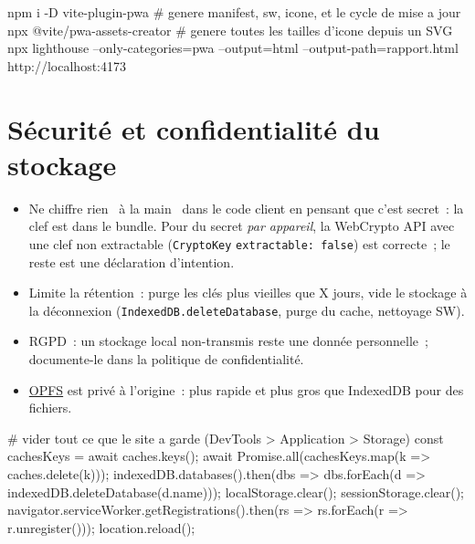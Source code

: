 \documentclass[12pt,a4paper,twoside,openright]{book}
\newcommand{\link}[2]{\href{#2}{#1}}
\begin{document}
\begin{terminal}
npm i -D vite-plugin-pwa       # genere manifest, sw, icone, et le cycle de mise a jour
npx @vite/pwa-assets-creator   # genere toutes les tailles d'icone depuis un SVG
npx lighthouse --only-categories=pwa --output=html --output-path=rapport.html http://localhost:4173
\end{terminal}

\section{S\'ecurit\'e et confidentialit\'e du stockage}

\begin{itemize}
  \item Ne chiffre rien \og ~\`a la main~ \fg{} dans le code client en pensant que c'est secret~:
        la clef est dans le bundle. Pour du secret \emph{par appareil}, la WebCrypto API avec une
        clef non extractable (\verb|CryptoKey| \verb|extractable: false|) est correcte~; le reste
        est une d\'eclaration d'intention.
  \item Limite la r\'etention~: purge les cl\'es plus vieilles que X jours, vide le stockage \`a la
        d\'econnexion (\verb|IndexedDB.deleteDatabase|, purge du cache, nettoyage SW).
  \item RGPD~: un stockage local non-transmis reste une donn\'ee personnelle~; documente-le dans la
        politique de confidentialit\'e.
  \item \link{OPFS}{https://developer.mozilla.org/en-US/docs/Web/API/File\_System\_API/Origin\_private\_file\_system}
        est priv\'e \`a l'origine~: plus rapide et plus gros que IndexedDB pour des fichiers.
\end{itemize}

\begin{terminal}
# vider tout ce que le site a garde (DevTools > Application > Storage)
const cachesKeys = await caches.keys(); await Promise.all(cachesKeys.map(k => caches.delete(k)));
indexedDB.databases().then(dbs => dbs.forEach(d => indexedDB.deleteDatabase(d.name)));
localStorage.clear(); sessionStorage.clear();
navigator.serviceWorker.getRegistrations().then(rs => rs.forEach(r => r.unregister()));
location.reload();
\end{terminal}
\end{document}
